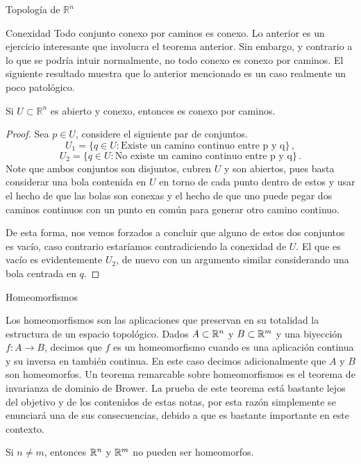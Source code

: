 \begin{chapter}{Topología de $\mathbb{R}^n$}
\begin{section}{Conexidad}
Todo conjunto conexo por caminos es conexo. Lo anterior es un ejercicio interesante que involucra el teorema anterior. Sin embargo, y contrario a lo que se podría intuir normalmente, no todo conexo es conexo por caminos. El siguiente resultado muestra que lo anterior mencionado es un caso realmente un poco patológico.  

\begin{them}

Si $U \subset \mathbb{R}^n$ es abierto y conexo, entonces es conexo por caminos.

\end{them}

\begin{proof}

Sea $p \in U$, considere el siguiente par de conjuntos. 
$$U_1 = \{ q \in U: \text{Existe un camino continuo entre p y q} \}\,,$$
$$U_2 =  \{ q \in U: \text{No existe un camino continuo entre p y q} \}\,.$$
Note que ambos conjuntos son disjuntos, cubren $U$ y son abiertos, pues basta considerar una bola contenida en $U$ en torno de cada punto dentro de estos y usar el hecho de que las bolas son conexas y el hecho de que uno puede pegar dos caminos continuos con un punto en común para generar otro camino continuo.

De esta forma, nos vemos forzados a concluir que alguno de estos dos conjuntos es vacío, caso contrario estaríamos contradiciendo la conexidad de $U$. El que es vacío es evidentemente $U_2$, de nuevo con un argumento similar considerando una bola centrada en $q$.
\end{proof}

\begin{section}{Homeomorfismos}

Los homeomorfismos son las aplicaciones que preservan en su totalidad la estructura de un espacio topológico. Dados $A\subset \mathbb{R}^n$ y $B \subset \mathbb{R}^m$ y una biyección $f:A \to B$, decimos que $f$ es un homeomorfismo cuando es una aplicación continua y su inversa en también continua. En este caso decimos adicionalmente que $A$ y $B$ son homeomorfos. Un teorema remarcable sobre homeomorfismos es el teorema de invarianza de dominio de Brower. La prueba de este teorema está bastante lejos del objetivo y de los contenidos de estas notas, por esta razón simplemente se enunciará una de sus consecuencias, debido a que es bastante importante en este contexto. 

\begin{them}

Si $n\neq m$, entonces $\mathbb{R}^n$ y $\mathbb{R}^m$ no pueden ser homeomorfos.


\end{them}
\end{section}
\end{section}
\end{chapter}
